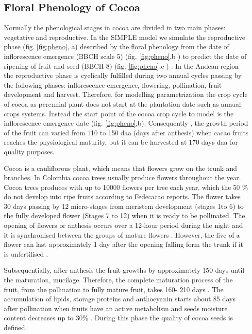 \documentclass[gene,journal,article,submit,moreauthors,pdftex]{Definitions/mdpi}
\begin{document}
\subsection{Floral Phenology of Cocoa }
Normally the phenological stages in cocoa are  divided in two main phases: vegetative and reproductive. In the SIMPLE model we simulate the reproductive phase (fig. \ref{fig:pheno}, a) described by the floral phenology from the date of inflorescence emergence (BBCH scale 5) (fig. \ref{fig:pheno},b ) to predict the date of ripening of fruit and seed (BBCH 8) (fig. \ref{fig:pheno},c ) \citep{Niemenak2010} . In the Andean region the reproductive phase is cyclically fulfilled during two annual cycles passing by the following phases: inflorescence emergence, flowering, pollination, fruit development and harvest. Therefore, for modelling parametrization the crop cycle of cocoa as perennial plant does not start at the plantation date such as annual crops systems. Instead  the start point of the cocoa crop cycle to model is the inflorescence emergence date (fig. \ref{fig:pheno},b). Consequently , the growth period of the fruit can varied from  110 to 150  daa (days after anthesis) \citep{lopez2018} when cacao fruits reaches the physiological maturity, but it can be harvested at 170 days daa \citep{Niemenak2010} for quality purposes.

Cocoa is a cauliflorous plant, which means that flowers grow on the trunk and branches. In Colombia cocoa trees usually produce flowers throughout the year. Cocoa trees produces with up to 10000 flowers per tree each year, which the 50 \%  do not develop into ripe fruits according to Fedecacao reports. The flower takes 30 days passing by 12 micro-stages from meristem development (stages 1to 6) to the fully developed flower (Stages 7 to 12) \citep{swanson2005} when it is ready to be pollinated. The opening of flowers or anthesis  occurs over a 12-hour period during the night and it is synchronised between the groups of mature flowers \citep{Niemenak2010}. However, the live of a flower can last approximately 1 day after the opening falling form the trunk if it is unfertilised \citep{cheesman1927, Niemenak2010}.

Subsequentially, after anthesis the fruit growths by approximately 150 days until the maturation, mucilage. Therefore, the complete maturation process of the fruit, from the pollination to fully mature fruit, takes 160- 210 days \citep{berry1994}. The accumulation of lipids, storage proteins and anthocyanin starts about 85 days after pollination when fruits have an active metabolism and seeds   moisture content decreases up to 30\% \citep{Lehrian1980, Niemenak2010}. During this phase the quality of cocoa seeds is defined.
\end{document}
